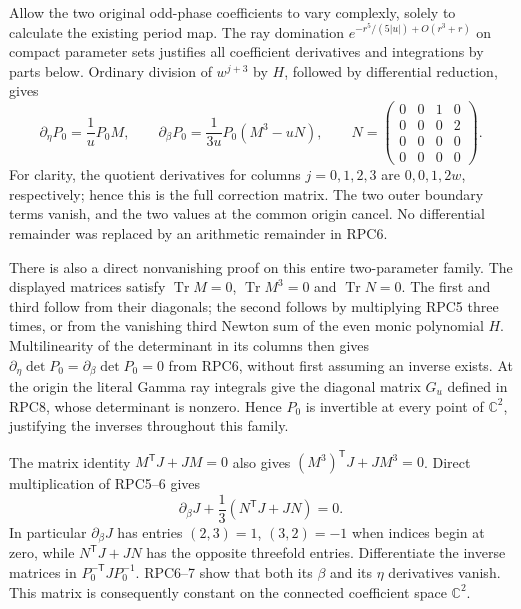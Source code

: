 \documentclass[11pt,a4paper]{article}
\begin{document}
Allow the two original odd-phase coefficients to vary complexly,
solely to calculate the existing period map. The ray domination
$e^{-r^5/(5|u|)+O(r^3+r)}$ on compact parameter sets justifies all
coefficient derivatives and integrations by parts below. Ordinary
division of $w^{j+3}$ by $H$, followed by differential reduction,
gives
\[
 \partial_\eta P_0=\frac1uP_0M,\qquad
 \partial_\beta P_0=\frac1{3u}P_0(M^3-uN),\qquad
 N=\begin{pmatrix}0&0&1&0\\0&0&0&2\\0&0&0&0\\0&0&0&0\end{pmatrix}.
 \tag{RPC6}
\]
For clarity, the quotient derivatives for columns $j=0,1,2,3$ are
$0,0,1,2w$, respectively; hence this is the full correction matrix.
The two outer boundary terms vanish, and the two values at the common
origin cancel. No differential remainder was replaced by an arithmetic
remainder in RPC6.

There is also a direct nonvanishing proof on this entire two-parameter
family. The displayed matrices satisfy $\operatorname{Tr}M=0$,
$\operatorname{Tr}M^3=0$ and $\operatorname{Tr}N=0$. The first and
third follow from their diagonals; the second follows by multiplying
RPC5 three times, or from the vanishing third Newton sum of the even
monic polynomial $H$. Multilinearity of the determinant in its columns
then gives $\partial_\eta\det P_0=\partial_\beta\det P_0=0$ from
RPC6, without first assuming an inverse exists. At the origin the
literal Gamma ray integrals give the diagonal matrix $G_u$ defined in
RPC8, whose determinant is nonzero. Hence $P_0$ is invertible at every
point of $\mathbb C^2$, justifying the inverses throughout this family.

The matrix identity $M^{\mathsf T}J+JM=0$ also gives
$(M^3)^{\mathsf T}J+JM^3=0$. Direct multiplication of RPC5--6 gives
\[
 \partial_\beta J+\frac13(N^{\mathsf T}J+JN)=0.
 \tag{RPC7}
\]
In particular $\partial_\beta J$ has entries $(2,3)=1$, $(3,2)=-1$
when indices begin at zero, while $N^{\mathsf T}J+JN$ has the
opposite threefold entries. Differentiate the inverse matrices in
$P_0^{-\mathsf T}JP_0^{-1}$. RPC6--7 show that both its $\beta$ and
its $\eta$ derivatives vanish. This matrix is consequently constant
on the connected coefficient space $\mathbb C^2$.
\end{document}
